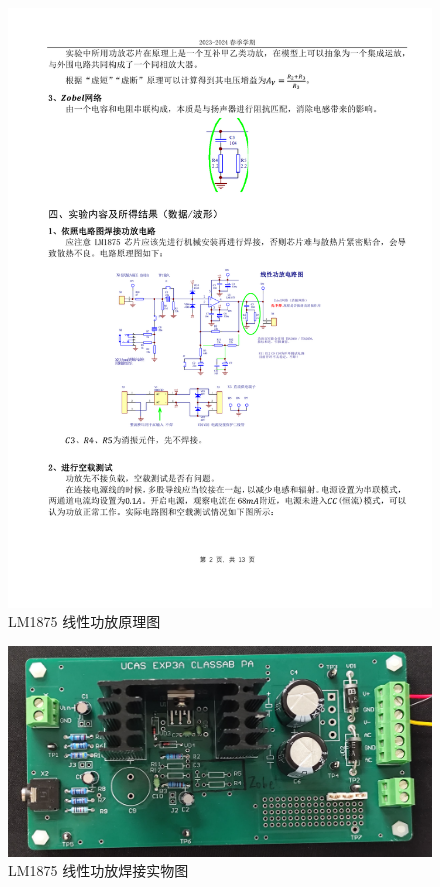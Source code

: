 \documentclass[UTF8]{article}
\begin{document}
\begin{figure}[H]\centering
    \includegraphics[width=0.9\columnwidth]{LCE-03-功率放大器/assets/功率放大器原理图.pdf}
    \caption{LM1875 线性功放原理图}
    \label{fig: LM1875 线性功放原理图}
\end{figure}

\begin{figure}[H]\centering
    \includegraphics[width=0.9\columnwidth]{LCE-03-功率放大器/assets/焊接实物图.png}
    \caption{LM1875 线性功放焊接实物图}
\end{figure}
\end{document}

